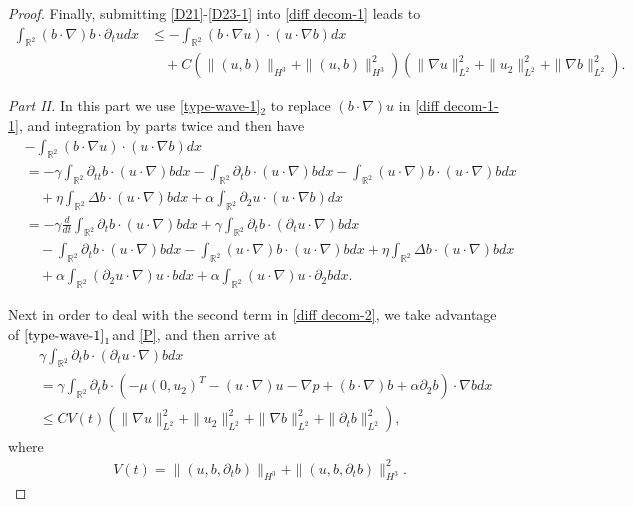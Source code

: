 \documentclass[10pt,a4paper]{amsart}
\def\R{\mathbb R}
\begin{document}
\begin{proof}
Finally, submitting \eqref{D21}-\eqref{D23-1} into \eqref{diff decom-1} leads to
\begin{align}\label{diff decom-1-1}
\int_{\R^2}(b\cdot \nabla)b\cdot \partial_tudx&\leq-\int_{\R^2}(b\cdot \nabla u)\cdot(u\cdot \nabla b)dx\nonumber\\
& \quad+C\left(\|(u,b)\|_{H^3}+\|(u,b)\|_{H^3}^2\right)\left(\|\nabla u\|_{L^{2}}^2+\|u_2\|_{L^2}^2+\|\nabla b\|_{L^2}^2\right).
\end{align}

 {\it {Part II.}} In this part we  use \eqref{type-wave-1}$_2$ to replace $(b\cdot \nabla) u$ in \eqref{diff decom-1-1}, and integration by parts twice and then have
\begin{align}
&-\int_{\R^2}(b\cdot \nabla u)\cdot(u\cdot \nabla b)dx\nonumber\\
&=-\gamma\int_{\R^2}\partial_{tt}b\cdot (u\cdot\nabla )bdx-\int_{\R^2}\partial_{t}b\cdot (u\cdot\nabla )bdx-\int_{\R^2}(u\cdot\nabla) b\cdot (u\cdot\nabla) bdx\nonumber\\
&\quad+\eta\int_{\R^2}\Delta b\cdot (u\cdot\nabla) bdx+\alpha\int_{\R^2}\partial_2u\cdot (u\cdot\nabla b)dx\nonumber\\
&=-\gamma\frac{d}{dt}\int_{\R^2}\partial_{t}b\cdot (u\cdot\nabla) bdx+\gamma\int_{\R^2}\partial_{t}b\cdot (\partial_{t}u\cdot\nabla) bdx\nonumber\\
&\quad-\int_{\R^2}\partial_{t}b\cdot (u\cdot\nabla) bdx-\int_{\R^2}(u\cdot\nabla) b\cdot (u\cdot\nabla) bdx+\eta\int_{\R^2}\Delta b\cdot (u\cdot\nabla) bdx\nonumber\\
&\quad+\alpha\int_{\R^2}(\partial_2u\cdot \nabla) u\cdot bdx+\alpha\int_{\R^2}(u\cdot \nabla )u\cdot\partial_2 bdx.
\label{diff decom-2}
\end{align}

Next in order to deal with the second term in \eqref{diff decom-2}, we take advantage of $\eqref{type-wave-1}_1$and \eqref{P}, and then arrive at
\begin{align}\label{DD}
&\gamma\int_{\R^2}\partial_{t}b\cdot (\partial_{t}u\cdot\nabla) bdx\nonumber\\
&=\gamma\int_{\R^2}\partial_{t}b\cdot (-\mu(0,u_2)^{T} - (u \cdot \nabla) u -\nabla p+(b \cdot \nabla) b+\alpha\partial_2 b)\cdot\nabla bdx\nonumber\\
&\leq  CV(t)\left(\|\nabla u\|_{L^{2}}^2+\|u_2\|_{L^2}^2+\|\nabla b\|_{L^2}^2+\|\partial_tb\|_{L^{2}}^2\right),
\end{align}
where
\begin{align}\label{VT}
V(t)=\|(u,b,\partial_tb)\|_{H^{3}}+\|(u,b,\partial_tb)\|_{H^{3}}^2.
\end{align}


\end{proof}
\end{document}
